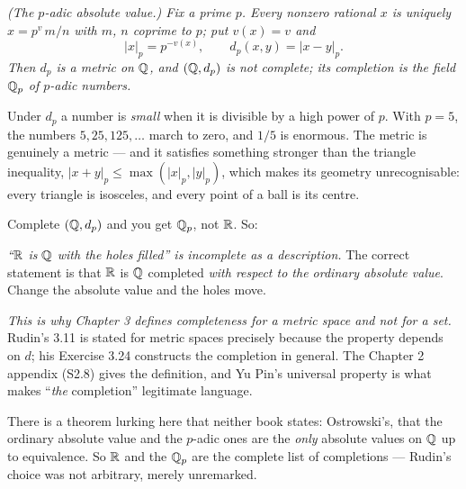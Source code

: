 \emph{(The $p$-adic absolute value.) Fix a prime $p$. Every nonzero rational
$x$ is uniquely $x = p^{v}\,m/n$ with $m$, $n$ coprime to $p$; put
$v(x) = v$ and}
\[ |x|_p = p^{-v(x)}, \qquad d_p(x,y) = |x-y|_p . \]
\emph{Then $d_p$ is a metric on $\mathbb{Q}$, and $(\mathbb{Q}, d_p)$ is not complete; its
completion is the field $\mathbb{Q}_p$ of $p$-adic numbers.}

\begin{deeper}
Under $d_p$ a number is \emph{small} when it is divisible by a high power of
$p$. With $p = 5$, the numbers $5, 25, 125, \dots$ march to zero, and
$1/5$ is enormous. The metric is genuinely a metric --- and it satisfies
something stronger than the triangle inequality,
$|x+y|_p \le \max(|x|_p,|y|_p)$, which makes its geometry unrecognisable:
every triangle is isosceles, and every point of a ball is its centre.

Complete $(\mathbb{Q},d_p)$ and you get $\mathbb{Q}_p$, not $\mathbb{R}$. So:

\smallskip
\emph{``$\mathbb{R}$ is $\mathbb{Q}$ with the holes filled'' is incomplete as a description.}
The correct statement is that $\mathbb{R}$ is $\mathbb{Q}$ completed \emph{with respect to
the ordinary absolute value}. Change the absolute value and the holes move.

\smallskip
\emph{This is why Chapter 3 defines completeness for a metric space and not
for a set.} Rudin's 3.11 is stated for metric spaces precisely because the
property depends on $d$; his Exercise 3.24 constructs the completion in
general. The Chapter 2 appendix (S2.8) gives the definition, and Yu Pin's
universal property is what makes ``\emph{the} completion'' legitimate
language.

\smallskip
There is a theorem lurking here that neither book states: Ostrowski's, that
the ordinary absolute value and the $p$-adic ones are the \emph{only}
absolute values on $\mathbb{Q}$ up to equivalence. So $\mathbb{R}$ and the $\mathbb{Q}_p$ are the
complete list of completions --- Rudin's choice was not arbitrary, merely
unremarked.
\end{deeper}


